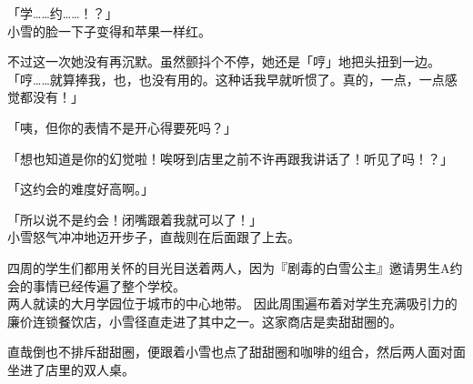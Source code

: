 「学……约……！？」\\

小雪的脸一下子变得和苹果一样红。

不过这一次她没有再沉默。虽然颤抖个不停，她还是「哼」地把头扭到一边。\\

「哼……就算捧我，也，也没有用的。这种话我早就听惯了。真的，一点，一点感觉都没有！」

「咦，但你的表情不是开心得要死吗？」

「想也知道是你的幻觉啦！唉呀到店里之前不许再跟我讲话了！听见了吗！？」

「这约会的难度好高啊。」

「所以说不是约会！闭嘴跟着我就可以了！」\\

小雪怒气冲冲地迈开步子，直哉则在后面跟了上去。

四周的学生们都用关怀的目光目送着两人，因为『剧毒的白雪公主』邀请男生A约会的事情已经传遍了整个学校。\\

两人就读的大月学园位于城市的中心地带。
因此周围遍布着对学生充满吸引力的廉价连锁餐饮店，小雪径直走进了其中之一。这家商店是卖甜甜圈的。

直哉倒也不排斥甜甜圈，便跟着小雪也点了甜甜圈和咖啡的组合，然后两人面对面坐进了店里的双人桌。\\

